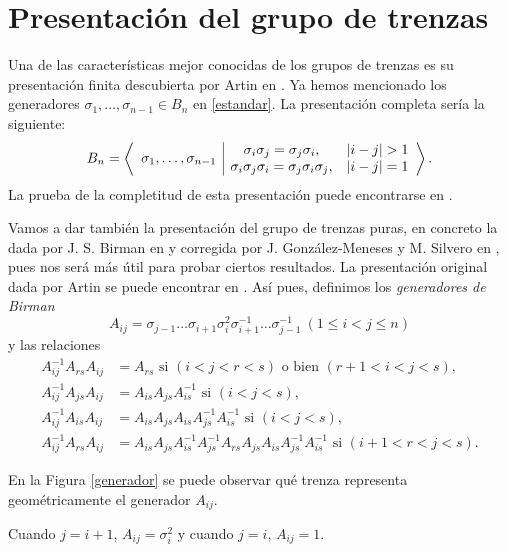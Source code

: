 \documentclass[TFG.tex]{subfiles}
\begin{document}

\section{Presentación del grupo de trenzas}
Una de las características mejor conocidas de los grupos de trenzas es su presentación finita descubierta por Artin en \cite{Artin}. Ya hemos mencionado los generadores $\sigma_1,\dots,\sigma_{n-1}\in B_n$ en \ref{estandar}. La presentación completa sería la siguiente:
\begin{equation}\label{presentacion}
B_n=\left\langle\begin{array}{c| c c}
\multirow{2}{*}{$\sigma_1,\dots,\sigma_{n-1}$} & \sigma_i\sigma_j=\sigma_j\sigma_i, & |i-j|>1\\
& \sigma_i\sigma_j\sigma_i=\sigma_j\sigma_i\sigma_j, & |i-j|=1
\end{array}\right\rangle.
\end{equation}
La prueba de la completitud de esta presentación puede encontrarse en \cite{Magnus}. 

Vamos a dar también la presentación del grupo de trenzas puras, en concreto la dada por J. S. Birman en \cite{Birman} y corregida por J. González-Meneses y M. Silvero en \cite{polynomial}, pues nos será más útil para probar ciertos resultados. La presentación original dada por Artin se puede encontrar en \cite{Artin}. Así pues, definimos los \emph{generadores de Birman}
\begin{equation}\label{birman}
A_{ij}=\sigma_{j-1}\dots\sigma_{i+1}\sigma_i^2\sigma_{i+1}^{-1}\dots\sigma_{j-1}^{-1}\ (1\leq i<j\leq n)
\end{equation}
y las relaciones %
\begin{align*}
A_{ij}^{-1}A_{rs}A_{ij}&=A_{rs}\text{ si } (i<j<r<s)\text{ o bien } (r+1<i<j<s),\\
A_{ij}^{-1}A_{js}A_{ij}&=A_{is}A_{js}A_{is}^{-1} \text{ si } (i<j<s),\\
A_{ij}^{-1}A_{is}A_{ij}&=A_{is}A_{js}A_{is}A_{js}^{-1}A_{is}^{-1}\text{ si } (i<j<s),\\
A_{ij}^{-1}A_{rs}A_{ij}&=A_{is}A_{js}A_{is}^{-1}A_{js}^{-1}A_{rs}A_{js}A_{is}A_{js}^{-1}A_{is}^{-1}\text{ si } (i+1<r<j<s).
\end{align*}

En la Figura \ref{generador} se puede observar qué trenza representa geométricamente el generador $A_{ij}$. 

\begin{nota}
Cuando $j=i+1$, $A_{ij}=\sigma_i^2$ y cuando $j=i$, $A_{ij}=1$. 
\end{nota}
\end{document}
